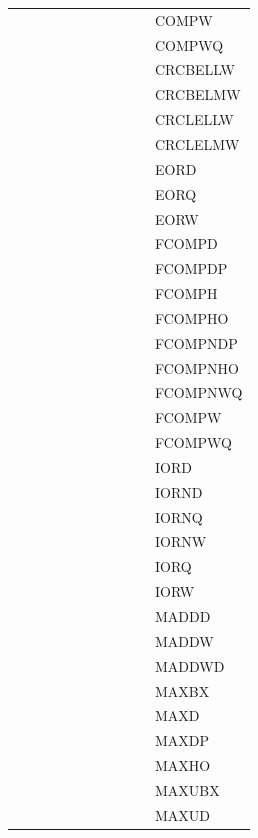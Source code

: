 {\begin{tabular}{|l|l|l|l|l|l|l|l|l|l|l|}
 & & & & & & & & & & \textsf{COMPW} \\
 & & & & & & & & & & \textsf{COMPWQ} \\
 & & & & & & & & & & \textsf{CRCBELLW} \\
 & & & & & & & & & & \textsf{CRCBELMW} \\
 & & & & & & & & & & \textsf{CRCLELLW} \\
 & & & & & & & & & & \textsf{CRCLELMW} \\
 & & & & & & & & & & \textsf{EORD} \\
 & & & & & & & & & & \textsf{EORQ} \\
 & & & & & & & & & & \textsf{EORW} \\
 & & & & & & & & & & \textsf{FCOMPD} \\
 & & & & & & & & & & \textsf{FCOMPDP} \\
 & & & & & & & & & & \textsf{FCOMPH} \\
 & & & & & & & & & & \textsf{FCOMPHO} \\
 & & & & & & & & & & \textsf{FCOMPNDP} \\
 & & & & & & & & & & \textsf{FCOMPNHO} \\
 & & & & & & & & & & \textsf{FCOMPNWQ} \\
 & & & & & & & & & & \textsf{FCOMPW} \\
 & & & & & & & & & & \textsf{FCOMPWQ} \\
 & & & & & & & & & & \textsf{IORD} \\
 & & & & & & & & & & \textsf{IORND} \\
 & & & & & & & & & & \textsf{IORNQ} \\
 & & & & & & & & & & \textsf{IORNW} \\
 & & & & & & & & & & \textsf{IORQ} \\
 & & & & & & & & & & \textsf{IORW} \\
 & & & & & & & & & & \textsf{MADDD} \\
 & & & & & & & & & & \textsf{MADDW} \\
 & & & & & & & & & & \textsf{MADDWD} \\
 & & & & & & & & & & \textsf{MAXBX} \\
 & & & & & & & & & & \textsf{MAXD} \\
 & & & & & & & & & & \textsf{MAXDP} \\
 & & & & & & & & & & \textsf{MAXHO} \\
 & & & & & & & & & & \textsf{MAXUBX} \\
 & & & & & & & & & & \textsf{MAXUD} \\

\end{tabular}}
